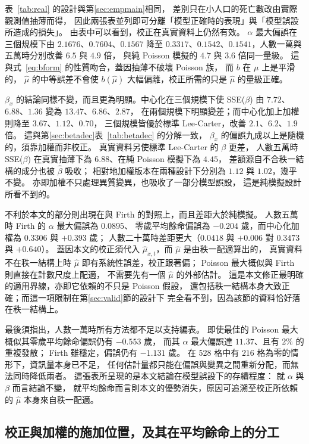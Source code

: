 \documentclass[UTF8, fontset=macnew, a4paper, 12pt]{ctexart}
\begin{document}
表~\ref{tab:real} 的設計與第\ref{sec:empmain}相同，
差別只在小人口的死亡數改由實際觀測值抽薄而得，
因此兩張表並列即可分離「模型正確時的表現」與「模型誤設所造成的損失」。
由表中可以看到，校正在真實資料上仍然有效。
$\alpha$ 最大偏誤在三個規模下由 $2.1676$、$0.7604$、$0.1567$
降至 $0.3317$、$0.1542$、$0.1541$，人數一萬與五萬時分別改善 $6.5$ 與 $4.9$ 倍，
與純 Poisson 模擬的 $4.7$ 與 $3.6$ 倍同一量級。
這與式~\eqref{eq:bform} 的性質吻合，蓋因抽薄不破壞 Poisson 族，
而 $b$ 在 $\mu$ 上是平滑的， $\hat\mu$ 的中等誤差不會使 $b(\hat\mu)$
大幅偏離，校正所需的只是 $\hat\mu$ 的量級正確。

$\beta_x$ 的結論同樣不變，而且更為明顯。中心化在三個規模下使
SSE($\beta$) 由 $7.72$、$6.88$、$1.36$ 變為 $13.47$、$6.86$、$2.87$，
在兩個規模下明顯變差；而中心化加上加權則降至 $3.67$、$1.12$、$0.70$，
三個規模皆優於標準 Lee-Carter，改善 $2.1$、$6.2$、$1.9$ 倍。
這與第\ref{sec:betadec}表~\ref{tab:betadec} 的分解一致，
$\beta_x$ 的偏誤九成以上是隨機的，須靠加權而非校正。
真實資料另使標準 Lee-Carter 的 $\beta$ 更差，
人數五萬時 SSE($\beta$) 在真實抽薄下為 $6.88$、在純 Poisson 模擬下為 $4.45$，
差額源自不合秩一結構的成分也被 $\hat\beta$ 吸收；
相對地加權版本在兩種設計下分別為 $1.12$ 與 $1.02$，幾乎不變。
亦即加權不只處理異質變異，也吸收了一部分模型誤設，
這是純模擬設計所看不到的。

不利於本文的部分則出現在與 Firth 的對照上，而且差距大於純模擬。
人數五萬時 Firth 的 $\alpha$ 最大偏誤為 $0.0895$、
零歲平均餘命偏誤為 $-0.204$ 歲，而中心化加權為 $0.3306$ 與 $+0.393$ 歲；
人數二十萬時差距更大（$0.0418$ 與 $+0.006$ 對 $0.3473$ 與 $+0.640$）。
蓋因本文的校正須代入 $\hat\mu_{x,t}$，而 $\hat\mu$ 是由秩一配適算出的，
真實資料不在秩一結構上時 $\hat\mu$ 即有系統性誤差，校正跟著偏；
Poisson 最大概似與 Firth 則直接在計數尺度上配適，
不需要先有一個 $\hat\mu$ 的外部估計。
這是本文修正最明確的適用界線，亦即它依賴的不只是 Poisson 假設，
還包括秩一結構本身大致正確；而這一項限制在第\ref{sec:valid}節的設計下
完全看不到，因為該節的資料恰好落在秩一結構上。

最後須指出，人數一萬時所有方法都不足以支持編表。
即使最佳的 Poisson 最大概似其零歲平均餘命偏誤仍有 $-0.553$ 歲，
而其 $\alpha$ 最大偏誤達 $11.37$、且有 $2\%$ 的重複發散；
Firth 雖穩定，偏誤仍有 $-1.131$ 歲。
在 528 格中有 $216$ 格為零的情形下，資訊量本身已不足，
任何估計量都只能在偏誤與變異之間重新分配，而無法同時降低兩者。
這張表所呈現的是本文結論在模型誤設下的存續程度：
就 $\alpha$ 與 $\beta$ 而言結論不變，
就平均餘命而言則本文的優勢消失，原因可追溯至校正所依賴的 $\hat\mu$
本身來自秩一配適。

\subsection{校正與加權的施加位置，及其在平均餘命上的分工}\label{sec:joint}\label{sec:split}
\end{document}
